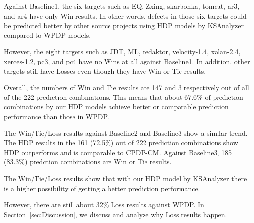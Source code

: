 Against Baseline1, the six targets such as EQ, Zxing, skarbonka, tomcat,
ar3, and ar4 have only Win results. In other words, defects in those six targets
could be predicted better by other source projects using HDP models by
KSAnalyzer compared to WPDP models.

However, the eight targets such as JDT, ML, redaktor, velocity-1.4, xalan-2.4,
xerces-1.2, pc3, and pc4 have no Wins at all against Baseline1. In
addition, other targets still have Losses even though they have Win or Tie
results.

Overall, the numbers of Win and
Tie results are 147 and 3 respectively out of all of the 222 prediction
combinations.
This means that about 67.6\% of prediction combinations by our HDP
models achieve better or comparable prediction performance than those in
WPDP.

The Win/Tie/Loss results against Baseline2 and Baseline3 show a similar trend.
The HDP results in the 161 (72.5\%) out of 222 prediction combinations show
HDP outperforms and is comparable to CPDP-CM. Against Baseline3, 185
(83.3\%) predction combinations are Win or Tie results.

The Win/Tie/Loss results show that with our HDP model by
KSAnalyzer there is a higher possibility of getting a better prediction
performance.

However, there are still about 32\% Loss results against WPDP. In
Section~\ref{sec:Discussion}, we discuss and analyze why Loss results happen.


% 

